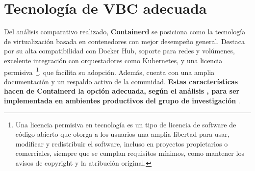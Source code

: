 \section{Tecnología de VBC adecuada}
\noindent
Del análisis comparativo realizado, \textbf{Containerd} se posiciona como la tecnología de virtualización basada en contenedores con mejor desempeño general. Destaca por su alta compatibilidad con Docker Hub, soporte para redes y volúmenes, excelente integración con orquestadores como Kubernetes, y una licencia permisiva~\footnote{Una licencia permisiva en tecnología es un tipo de licencia de software de código abierto que otorga a los usuarios una amplia libertad para usar, modificar y redistribuir el software, incluso en proyectos propietarios o comerciales, siempre que se cumplan requisitos mínimos, como mantener los avisos de copyright y la atribución original.}. que facilita su adopción. Además, cuenta con una amplia documentación y un respaldo activo de la comunidad. \textbf{Estas características hacen de Containerd la opción adecuada, según el análisis \DAR, para ser implementada en ambientes productivos del grupo de investigación \GRID}.
\clearpage

